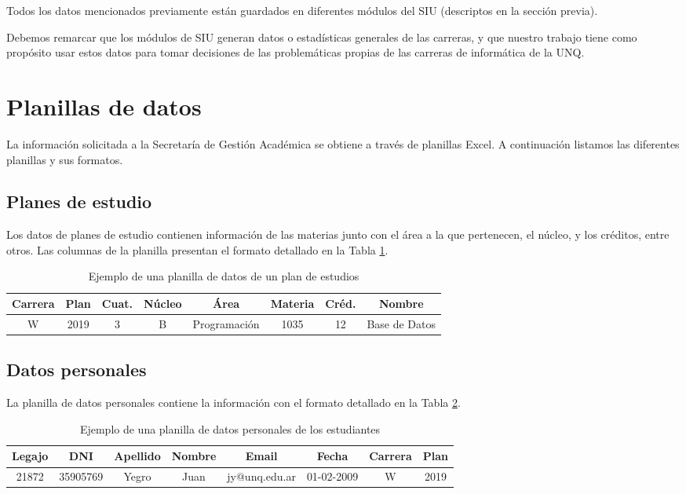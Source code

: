 Todos los datos mencionados previamente están guardados en diferentes módulos del SIU (descriptos en la sección previa).

Debemos remarcar que los módulos de SIU generan datos o estadísticas generales de las carreras, y que nuestro trabajo tiene como propósito usar estos datos para tomar decisiones de las problemáticas propias de las carreras de informática de la UNQ.



\section[Planillas de datos]{Planillas de datos}

La información solicitada a la Secretaría de Gestión Académica se obtiene a través de planillas Excel. A continuación listamos las diferentes planillas y sus formatos.

\subsection[Planes de estudio]{Planes de estudio}

Los datos de planes de estudio contienen información de las materias junto con el área a la que pertenecen, el núcleo, y los créditos, entre otros.
Las columnas de la planilla presentan el formato detallado en la Tabla \ref{tab:tabla_planes}.

\begin{table}[!htbp]
    \centering
    \begin{tabular}{|c|c|c|c|c|c|c|c|}
    \hline
    Carrera & Plan & Cuat. & Núcleo & Área & Materia & Créd. & Nombre \\ \hline
    W & 2019 & 3 & B & Programación & 1035 & 12 & Base de Datos  \\
    \hline
    \end{tabular}
    \caption{Ejemplo de una planilla de datos de un plan de estudios}
    \label{tab:tabla_planes}
\end{table}

\subsection[Datos personales]{Datos personales}

La planilla de datos personales contiene la información con el formato detallado en la Tabla \ref{tab:tabla_datos}.

\begin{table}[!htbp]
    \centering
    \begin{tabular}{|c|c|c|c|c|c|c|c|}
    \hline
    Legajo & DNI & Apellido & Nombre & Email & Fecha & Carrera & Plan \\ \hline
    21872 & 35905769 & Yegro & Juan & jy@unq.edu.ar & 01-02-2009 & W & 2019 \\
    \hline
    \end{tabular}
    \caption{Ejemplo de una planilla de datos personales de los estudiantes}
    \label{tab:tabla_datos}
\end{table}

